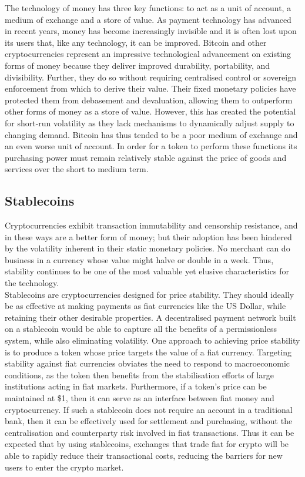 \noindent The technology of money has three key functions: to act as a unit of account, a medium of exchange and a store of value. As payment technology has advanced in recent years, money has become increasingly invisible and it is often lost upon its users that, like any technology, it can be improved. Bitcoin and other cryptocurrencies represent an impressive technological advancement on existing forms of money because they deliver improved durability, portability, and divisibility. Further, they do so without requiring centralised control or sovereign enforcement from which to derive their value. Their fixed monetary policies have protected them from debasement and devaluation, allowing them to outperform other forms of money as a store of value. However, this has created the potential for short-run volatility as they lack mechanisms to dynamically adjust supply to changing demand. Bitcoin has thus tended to be a poor medium of exchange and an even worse unit of account. In order for a token to perform these functions its purchasing power must remain relatively stable against the price of goods and services over the short to medium term.

\subsection{Stablecoins}

\noindent Cryptocurrencies exhibit transaction immutability and censorship resistance, and in these ways are a better form of money; but their adoption has been hindered by the volatility inherent in their static monetary policies. No merchant can do business in a currency whose value might halve or double in a week. Thus, stability continues to be one of the most valuable yet elusive characteristics for the technology. \\

\noindent Stablecoins are cryptocurrencies designed for price stability. They should ideally be as effective at making payments as fiat currencies like the US Dollar, while retaining their other desirable properties. A decentralised payment network built on a stablecoin would be able to capture all the benefits of a permissionless system, while also eliminating volatility. One approach to achieving price stability is to produce a token whose price targets the value of a fiat currency. Targeting stability against fiat currencies obviates the need to respond to macroeconomic conditions, as the token then benefits from the stabilisation efforts of large institutions acting in fiat markets. Furthermore, if a token’s price can be maintained at \$1, then it can serve as an interface between fiat money and cryptocurrency. If such a stablecoin does not require an account in a traditional bank, then it can be effectively used for settlement and purchasing, without the centralisation and counterparty risk involved in fiat transactions. Thus it can be expected that by using stablecoins, exchanges that trade fiat for crypto will be able to rapidly reduce their transactional costs, reducing the barriers for new users to enter the crypto market.

